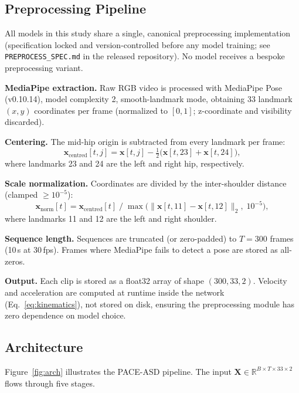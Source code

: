 \documentclass[a4paper,fleqn]{cas-sc}
\begin{document}
\subsection{Preprocessing Pipeline}
\label{sec:method_preprocess}

All models in this study share a single, canonical preprocessing implementation
(specification locked and version-controlled before any model training;
see \texttt{PREPROCESS\_SPEC.md} in the released repository).
No model receives a bespoke preprocessing variant.

\textbf{MediaPipe extraction.}
Raw RGB video is processed with MediaPipe Pose (v0.10.14), model complexity 2,
smooth-landmark mode, obtaining 33 landmark $(x,y)$ coordinates per frame
(normalized to $[0,1]$; z-coordinate and visibility discarded).

\textbf{Centering.}
The mid-hip origin is subtracted from every landmark per frame:
\begin{equation}
  \mathbf{x}_{\text{centred}}[t,j]
    = \mathbf{x}[t,j] - \tfrac{1}{2}\bigl(\mathbf{x}[t,23] + \mathbf{x}[t,24]\bigr),
  \label{eq:centering}
\end{equation}
where landmarks 23 and 24 are the left and right hip, respectively.

\textbf{Scale normalization.}
Coordinates are divided by the inter-shoulder distance (clamped $\ge 10^{-5}$):
\begin{equation}
  \mathbf{x}_{\text{norm}}[t]
    = \mathbf{x}_{\text{centred}}[t]
      \;\big/\;
      \max\!\bigl(\|\mathbf{x}[t,11] - \mathbf{x}[t,12]\|_2,\;10^{-5}\bigr),
  \label{eq:scale}
\end{equation}
where landmarks 11 and 12 are the left and right shoulder.

\textbf{Sequence length.}
Sequences are truncated (or zero-padded) to $T=300$ frames (10\,s at 30\,fps).
Frames where MediaPipe fails to detect a pose are stored as all-zeros.

\textbf{Output.}
Each clip is stored as a float32 array of shape $(300, 33, 2)$.
Velocity and acceleration are computed at runtime inside the network
(Eq.~\ref{eq:kinematics}), not stored on disk, ensuring the preprocessing
module has zero dependence on model choice.

\subsection{Architecture}
\label{sec:method_arch}

Figure~\ref{fig:arch} illustrates the PACE-ASD pipeline.
The input $\mathbf{X} \in \mathbb{R}^{B \times T \times 33 \times 2}$
flows through five stages.
\end{document}
